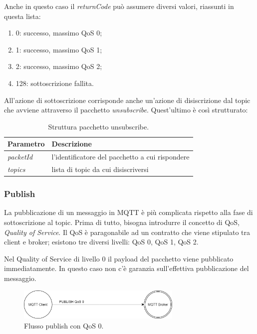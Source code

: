 \documentclass[binding=0.6cm,TFA]{sapthesis}
\begin{document}
\begin{large}
Anche in questo caso il \textit{returnCode} può assumere diversi valori, riassunti in questa lista:
\begin{enumerate}
\item 0: successo, massimo QoS 0;
\item 1: successo, massimo QoS 1;
\item 2: successo, massimo QoS 2;
\item 128: sottoscrizione fallita.
\end{enumerate}

All'azione di sottoscrizione corrisponde anche un'azione di disiscrizione dal topic che avviene attraverso il pacchetto \textit{unsubscribe}. Quest'ultimo è così strutturato:
\begin{table}[h]
\caption{Struttura pacchetto unsubscribe.}
\label{tab:unsubscribe}
\begin{tabular}{lp{}}
\toprule
\textbf{Parametro} & \textbf{Descrizione} \\
\midrule
\textit{packetId} & l'identificatore del pacchetto a cui rispondere \\
\textit{topics} & lista di topic da cui disiscriversi \\
\bottomrule
\end{tabular}
\end{table}

\subsubsection{Publish}
La pubblicazione di un messaggio in MQTT è più complicata rispetto alla fase di sottoscrizione al topic. Prima di tutto, bisogna introdurre il concetto di QoS, \textit{Quality of Service}. Il QoS è paragonabile ad un contratto che viene stipulato tra client e broker; esistono tre diversi livelli: QoS 0, QoS 1, QoS 2.


Nel Quality of Service di livello 0 il payload del pacchetto viene pubblicato immediatamente. In questo caso non c'è garanzia sull'effettiva pubblicazione del messaggio.
\begin{figure}[h]
\centering
\includegraphics[width=0.7\textwidth]{images/publish-qos0.png}
\caption{Flusso publish con QoS 0.}
\label{fig:qos-0pub}
\end{figure}


\end{large}
\end{document}
